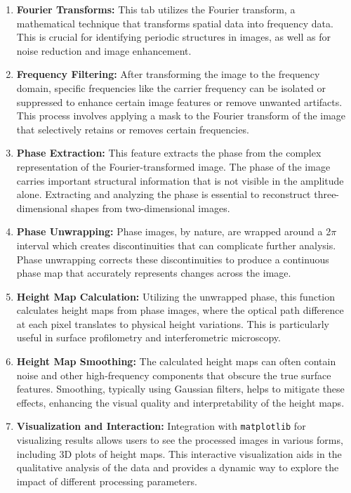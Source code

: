 \documentclass[../main.tex]{subfiles}
\begin{document}
\begin{enumerate}
    \setlength{\itemsep}{0.1mm}
    \item \textbf{Fourier Transforms:} This tab utilizes the Fourier transform, a mathematical technique that transforms spatial data into frequency data. This is crucial for identifying periodic structures in images, as well as for noise reduction and image enhancement.
    
    \item \textbf{Frequency Filtering:} After transforming the image to the frequency domain, specific frequencies like the carrier frequency can be isolated or suppressed to enhance certain image features or remove unwanted artifacts. This process involves applying a mask to the Fourier transform of the image that selectively retains or removes certain frequencies.
    
    \item \textbf{Phase Extraction:} This feature extracts the phase from the complex representation of the Fourier-transformed image. The phase of the image carries important structural information that is not visible in the amplitude alone. Extracting and analyzing the phase is essential to reconstruct three-dimensional shapes from two-dimensional images.
    
    \item \textbf{Phase Unwrapping:} Phase images, by nature, are wrapped around a 2$\pi$ interval which creates discontinuities that can complicate further analysis. Phase unwrapping corrects these discontinuities to produce a continuous phase map that accurately represents changes across the image.
    
    \item \textbf{Height Map Calculation:} Utilizing the unwrapped phase, this function calculates height maps from phase images, where the optical path difference at each pixel translates to physical height variations. This is particularly useful in surface profilometry and interferometric microscopy.
    
    \item \textbf{Height Map Smoothing:} The calculated height maps can often contain noise and other high-frequency components that obscure the true surface features. Smoothing, typically using Gaussian filters, helps to mitigate these effects, enhancing the visual quality and interpretability of the height maps.
    
    \item \textbf{Visualization and Interaction:} Integration with \texttt{matplotlib} for visualizing results allows users to see the processed images in various forms, including 3D plots of height maps. This interactive visualization aids in the qualitative analysis of the data and provides a dynamic way to explore the impact of different processing parameters.
\end{enumerate}
\end{document}
